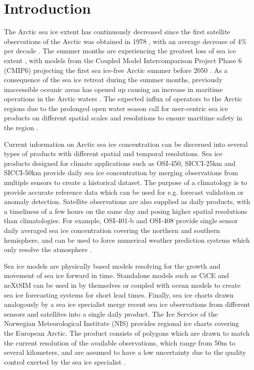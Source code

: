 \documentclass[../main/thesis.tex]{subfiles}
\begin{document}
\section{Introduction}
\label{sec:introduction}
The Arctic sea ice extent has continuously decreased since the first satellite observations of the Arctic was obtained in 1978 \citep{Serreze2019}, with an average decrease of 4\% per decade \citep{Cavalieri2012}. The summer months are experiencing the greatest loss of sea ice extent \citep{Comiso2017}, with models from the Coupled Model Intercomparison Project Phase 6 (CMIP6) projecting the first sea ice-free Arctic summer before 2050 \citep{Notz2020}. As a consequence of the sea ice retreat during the summer months, previously inaccessible oceanic areas has opened up causing an increase in maritime operations in the Arctic waters \citep{Eguiluz2016}. The expected influx of operators to the Arctic regions due to the prolonged open water season call for user-centric sea ice products on different spatial scales and resolutions to ensure maritime safety in the region \citep{Wagner2020, Veland2021}.

Current information on Arctic sea ice concentration can be discerned into several types of products with different spatial and temporal resolutions. Sea ice products designed for climate applications such as OSI-450, SICCI-25km and SICCI-50km provide daily sea ice concentration by merging observations from multiple sensors to create a historical dataset. The purpose of a climatology is to provide accurate reference data \citep{Lavergne2019} which can be used for e.g. forecast validation or anomaly detection. Satellite observations are also supplied as daily products, with a timeliness of a few hours on the same day and posing higher spatial resolutions than climatologies. For example, OSI-401-b \citep{Tonboe2017} and OSI-408 \citep{Lavelle2016} provide single sensor daily averaged sea ice concentration covering the northern and southern hemisphere, and can be used to force numerical weather prediction systems which only resolve the atmosphere \citep{Mueller2017}.

Sea ice models are physically based models resolving for the growth and movement of sea ice forward in time. Standalone models such as CiCE \citep{Hunke1997} and neXtSIM \citep{Williams2021} can be used in by themselves or coupled with ocean models \citep{Roehrs2022} to create sea ice forecasting systems for short lead times. Finally, sea ice charts drawn analogously by a sea ice specialist merge recent sea ice observations from different sensors and satellites into a single daily product. The Ice Service of the Norwegian Meteorological Institute (NIS) provides regional ice charts covering the European Arctic. The product consists of polygons which are drawn to match the current resolution of the available observations, which range from 50m to several kilometers, and are assumed to have a low uncertainty due to the quality control exerted by the sea ice specialist \citep{Dinessen2020}.
\end{document}
